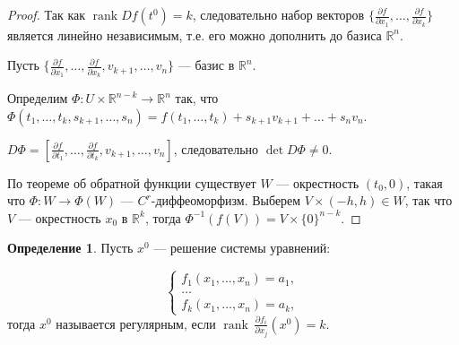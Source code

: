 \documentclass[a5paper]{article}
\newcounter{through}
\theoremstyle{plain}
\theoremstyle{definition}
\newtheorem{definition}[through]{Определение}
\numberwithin{through}{section}
\numberwithin{equation}{section}
\DeclareMathOperator{\rank}{rank}
\begin{document}
\begin{proof}
	Так как $\rank Df(t^0) = k$, следовательно набор векторов $\{ \frac{\partial f}{ \partial x_1}, \ldots, \frac{\partial f}{\partial x_k}\}$  является линейно независимым, т.е. его можно дополнить до базиса $\mathbb{R}^n$.
	
	Пусть $\{ \frac{\partial f}{ \partial x_1}, \ldots, \frac{\partial f}{\partial x_k}, v_{k+1}, \ldots, v_n\}$ --- базис в $\mathbb{R}^n$.
	
	Определим $\Phi : U \times \mathbb{R}^{n-k} \to \mathbb{R}^n$ так, что $\Phi(t_1, \ldots, t_k, s_{k+1}, \ldots, s_n)=f(t_1, \ldots, t_k) +s_{k+1}v_{k+1} + \ldots + s_n v_n$.
	
	$D \Phi = [ \frac{\partial f}{ \partial t_1}, \ldots, \frac{\partial f}{\partial t_k} , v_{k+1}, \ldots, v_n]$, следовательно $\det D \Phi \not= 0$.
	
	По теореме об обратной функции существует $W$ --- окрестность $(t_0, 0)$, такая что $\Phi : W \to \Phi(W)$ --- $C^r$-диффеоморфизм. Выберем $V \times (-h, h) \in W$, так что $V$ --- окрестность $x_0$ в $\mathbb{R}^k$, тогда $\Phi^{-1}(f(V))=V\times\{0\}^{n-k}$.
\end{proof}

\begin{definition}
	Пусть $x^0$ --- решение системы уравнений:
	
	\begin{equation*}
	\begin{cases}
	f_1(x_1, \ldots, x_n) = a_1,
	\\
	\ldots
	\\
	f_k(x_1, \ldots, x_n) = a_k,
	\end{cases}
	\end{equation*}
	тогда $x^0$ называется регулярным, если 
	$\rank \, \frac{\partial f_i}{\partial x_j} (x^0) = k$.
\end{definition}
\end{document}
